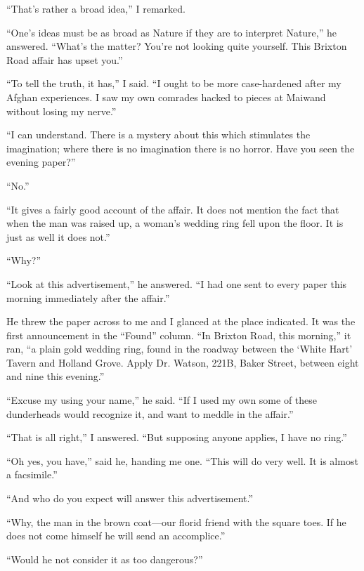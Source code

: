 \documentclass[12pt]{book}
\begin{document}
“That’s rather a broad idea,” I remarked. 

“One’s ideas must be as broad as Nature if they are to interpret Nature,” he answered. “What’s the matter? You’re not looking quite yourself. This Brixton Road affair has upset you.” 

“To tell the truth, it has,” I said. “I ought to be more case-hardened after my Afghan experiences. I saw my own comrades hacked to pieces at Maiwand without losing my nerve.” 

“I can understand. There is a mystery about this which stimulates the imagination; where there is no imagination there is no horror. Have you seen the evening paper?” 

“No.” 

“It gives a fairly good account of the affair. It does not mention the fact that when the man was raised up, a woman’s wedding ring fell upon the floor. It is just as well it does not.” 

“Why?” 

“Look at this advertisement,” he answered. “I had one sent to every paper this morning immediately after the affair.” 

He threw the paper across to me and I glanced at the place indicated. It was the first announcement in the “Found” column. “In Brixton Road, this morning,” it ran, “a plain gold wedding ring, found in the roadway between the ‘White Hart’ Tavern and Holland Grove. Apply Dr. Watson, 221B, Baker Street, between eight and nine this evening.” 

“Excuse my using your name,” he said. “If I used my own some of these dunderheads would recognize it, and want to meddle in the affair.” 

“That is all right,” I answered. “But supposing anyone applies, I have no ring.” 

“Oh yes, you have,” said he, handing me one. “This will do very well. It is almost a facsimile.” 

“And who do you expect will answer this advertisement.” 

“Why, the man in the brown coat—our florid friend with the square toes. If he does not come himself he will send an accomplice.” 

“Would he not consider it as too dangerous?” 
\end{document}

